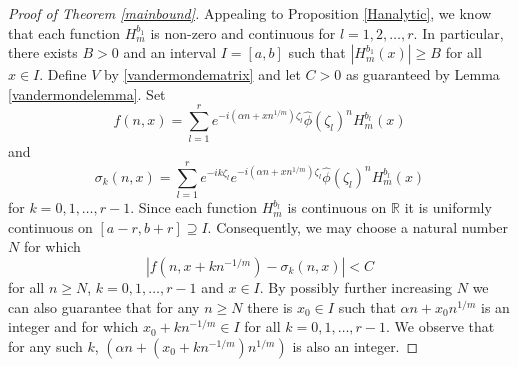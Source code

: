 \documentclass{article}
\theoremstyle{theorem}
\theoremstyle{remark}
\begin{document}
\begin{proof}[Proof of Theorem \ref{mainbound}]
Appealing to Proposition \ref{Hanalytic}, we know that each function
$H_m^{b_1}$ is non-zero and continuous for $l=1,2,\dots, r$. In particular, there exists $B>0$ and an interval $I=[a,b]$ such that $|H_m^{b_1}(x)|\geq
B$ for all $x\in I$. Define $V$ by \eqref{vandermondematrix} and let $C>0$ as guaranteed by Lemma \ref{vandermondelemma}. Set
\begin{equation}
f(n,x)=\sum_{l=1}^{r}e^{-i(\alpha n+xn^{1/m})\zeta_l}\hat{\phi}(\zeta_l)^n
H_m^{b_l}(x)
\end{equation}
and
\begin{equation}
\sigma_k(n,x)=\sum_{l=1}^{r}e^{-ik\zeta_l}e^{-i(\alpha n+xn^{1/m})\zeta_l}\hat{\phi}(\zeta_l)^n
H_m^{b_l}(x)
\end{equation}
for $k=0,1,\dots,r-1$. Since each function $H_m^{b_l}$ is continuous on $\mathbb{R}$ it is uniformly continuous on $[a-r,b+r]\supseteq I$. Consequently, we may choose a natural number $N$ for which
\begin{equation}\label{fsigmarelation}
|f(n,x+kn^{-1/m})-\sigma_k(n,x)|<C
\end{equation}
for all $n\geq N$, $k=0,1,\dots,r-1$ and $x\in I$.  By possibly further increasing $N$ we can also guarantee that for any $n\geq N$ there is $x_0\in I$ such that
$\alpha n+x_0 n^{1/m} $ is an integer and for which $x_0+kn^{-1/m}\in I $ for
all $k=0,1,\dots, r-1$. We observe that for any such $k$,  $(\alpha n+(x_0+kn^{-1/m}) n^{1/m})$ is also an integer.


\end{proof}
\end{document}
